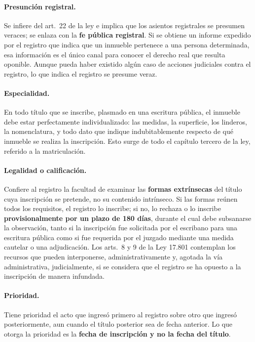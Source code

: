\documentclass[12pt,oneside]{book}
\begin{document}
\paragraph{Presunción registral.} Se infiere del art.~22 de la ley e implica que los asientos registrales se presumen veraces; se enlaza con la \textbf{fe pública registral}. Si se obtiene un informe expedido por el registro que indica que un inmueble pertenece a una persona determinada, esa información es el único canal para conocer el derecho real que resulta oponible. Aunque pueda haber existido algún caso de acciones judiciales contra el registro, lo que indica el registro se presume veraz.

\paragraph{Especialidad.} En todo título que se inscribe, plasmado en una escritura pública, el inmueble debe estar perfectamente individualizado: las medidas, la superficie, los linderos, la nomenclatura, y todo dato que indique indubitablemente respecto de qué inmueble se realiza la inscripción. Esto surge de todo el capítulo tercero de la ley, referido a la matriculación.

\paragraph{Legalidad o calificación.} Confiere al registro la facultad de examinar las \textbf{formas extrínsecas} del título cuya inscripción se pretende, no su contenido intrínseco. Si las formas reúnen todos los requisitos, el registro lo inscribe; si no, lo rechaza o lo inscribe \textbf{provisionalmente por un plazo de 180 días}, durante el cual debe subsanarse la observación, tanto si la inscripción fue solicitada por el escribano para una escritura pública como si fue requerida por el juzgado mediante una medida cautelar o una adjudicación. Los arts.~8 y 9 de la Ley 17.801 contemplan los recursos que pueden interponerse, administrativamente y, agotada la vía administrativa, judicialmente, si se considera que el registro se ha opuesto a la inscripción de manera infundada.

\paragraph{Prioridad.} Tiene prioridad el acto que ingresó primero al registro sobre otro que ingresó posteriormente, aun cuando el título posterior sea de fecha anterior. Lo que otorga la prioridad es la \textbf{fecha de inscripción y no la fecha del título}.
\end{document}
